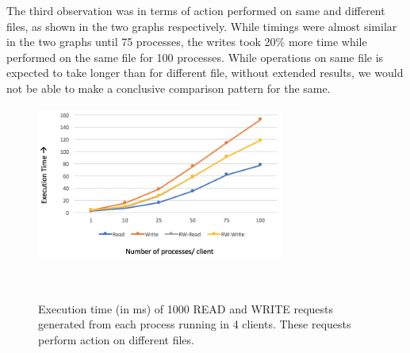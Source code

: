 The third observation was in terms of action performed on same and different files, as shown in the two graphs respectively. While timings were almost similar in the two graphs until 75 processes, the writes took 20\% more time while performed on the same file for 100 processes. While operations on same file is expected to take longer than for different file, without extended results, we would not be able to make a conclusive comparison pattern for the same. 


\begin{figure}
\centering
\includegraphics[height=2in, width=3.2in]{images/F-VHC-DF.png}
\caption{Execution time (in ms) of 1000 READ and WRITE requests generated from each process running in 4 clients. These requests perform action on different files.}~\label{fig:figure6}
\end{figure}










